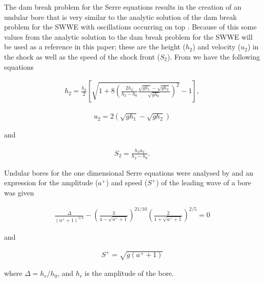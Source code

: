 \documentclass[SingleSpace,12pt,Proceedings]{Serre_ASCE}
\begin{document}
The dam break problem for the Serre equations results in the creation of an undular bore that is very similar to the analytic solution of the dam break problem for the SWWE with oscillations occurring on top \cite{Hank-etal-2010-2034}. Because of this some values from the analytic solution to the dam break problem for the SWWE will be used as a reference in this paper; these are the height ($h_2$) and velocity ($u_2$) in the shock as well as the speed of the shock front ($S_2$).  From  we have the following equations
\begin{linenomath*}
\begin{gather}
h_2 = \frac{h_0}{2} \left[\sqrt{1 + 8 \left(\frac{2h_2}{h_2 - h_0}\frac{\sqrt{gh_1} - \sqrt{gh_2}}{\sqrt{gh_0}}\right)^2} - 1\right],
\label{eq:h2def}
\end{gather}
\end{linenomath*}
\begin{linenomath*}
\begin{gather}
u_2 = 2\left(\sqrt{gh_1} - \sqrt{gh_2}\right)
\label{eq:u2def}
\end{gather}
\end{linenomath*}
and
\begin{linenomath*}
\begin{gather}
S_2 = \frac{h_2 u_2}{h_2 - h_0}.
\label{eq:S2def}
\end{gather}
\end{linenomath*}


Undular bores for the one dimensional Serre equations were analysed by  and an expression for the amplitude ($a^+$) and speed ($S^+$) of the leading wave of a bore was given
\begin{linenomath*}
\begin{gather}
\frac{\Delta}{\left(a^+ + 1\right)^{1/4}} - \left(\frac{3}{4 -  \sqrt{a^+ + 1}}\right)^{21/10} \left(\frac{2}{1 + \sqrt{a^+ + 1}}\right)^{2/5} = 0
\label{eq:aplusdef}
\end{gather}
\end{linenomath*}
and
\begin{linenomath*}
\begin{gather}
S^+ = \sqrt{g \left(a^+ + 1\right)}
\label{eq:splusdef}
\end{gather}
\end{linenomath*}
where $\Delta = h_r / h_0$, and $h_r$ is the amplitude of the bore.
\end{document}
